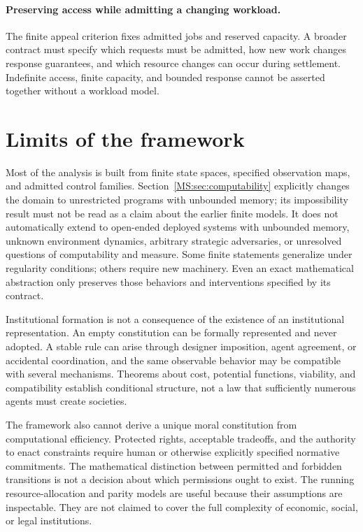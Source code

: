 \paragraph{Preserving access while admitting a changing workload.}
The finite appeal criterion fixes admitted jobs and reserved capacity. A broader contract must specify which requests must be admitted, how new work changes response guarantees, and which resource changes can occur during settlement. Indefinite access, finite capacity, and bounded response cannot be asserted together without a workload model.

\section{Limits of the framework}\label{MS:sec:limits}

Most of the analysis is built from finite state spaces, specified observation maps, and admitted control families. Section~\ref{MS:sec:computability} explicitly changes the domain to unrestricted programs with unbounded memory; its impossibility result must not be read as a claim about the earlier finite models. It does not automatically extend to open-ended deployed systems with unbounded memory, unknown environment dynamics, arbitrary strategic adversaries, or unresolved questions of computability and measure. Some finite statements generalize under regularity conditions; others require new machinery. Even an exact mathematical abstraction only preserves those behaviors and interventions specified by its contract.

Institutional formation is not a consequence of the existence of an institutional representation. An empty constitution can be formally represented and never adopted. A stable rule can arise through designer imposition, agent agreement, or accidental coordination, and the same observable behavior may be compatible with several mechanisms. Theorems about cost, potential functions, viability, and compatibility establish conditional structure, not a law that sufficiently numerous agents must create societies.

The framework also cannot derive a unique moral constitution from computational efficiency. Protected rights, acceptable tradeoffs, and the authority to enact constraints require human or otherwise explicitly specified normative commitments. The mathematical distinction between permitted and forbidden transitions is not a decision about which permissions ought to exist. The running resource-allocation and parity models are useful because their assumptions are inspectable. They are not claimed to cover the full complexity of economic, social, or legal institutions.

